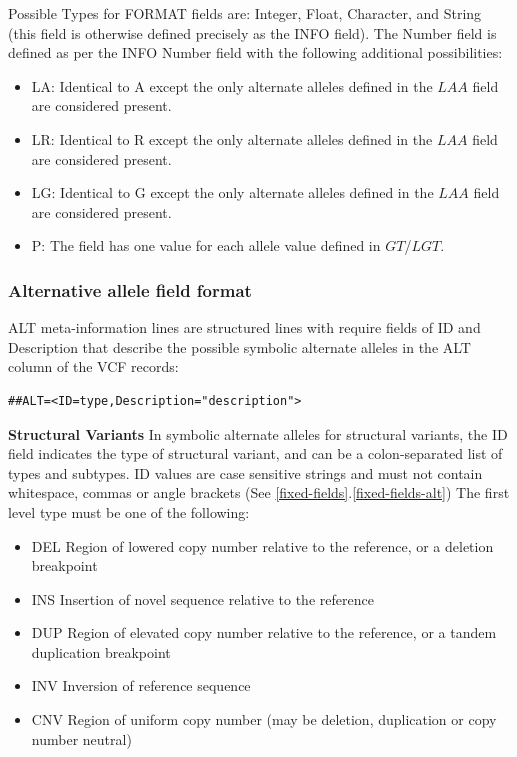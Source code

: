 \documentclass[8pt]{article}
\begin{document}
Possible Types for FORMAT fields are: Integer, Float, Character, and String (this field is otherwise defined precisely as the INFO field).
The Number field is defined as per the INFO Number field with the following additional possibilities:

\begin{itemize}
  \item LA: Identical to A except the only alternate alleles defined in the $LAA$ field are considered present.
  \item LR: Identical to R except the only alternate alleles defined in the $LAA$ field are considered present.
  \item LG: Identical to G except the only alternate alleles defined in the $LAA$ field are considered present.
  \item P: The field has one value for each allele value defined in $GT$/$LGT$.
\end{itemize}

\subsubsection{Alternative allele field format} \label{altfield}
ALT meta-information lines are structured lines with require fields of ID and Description that describe the possible symbolic alternate alleles in the ALT column of the VCF records:

\begin{verbatim}
##ALT=<ID=type,Description="description">
\end{verbatim}

\noindent \textbf{Structural Variants} \newline
In symbolic alternate alleles for structural variants, the ID field indicates the type of structural variant, and can be a colon-separated list of types and subtypes.
ID values are case sensitive strings and must not contain whitespace, commas or angle brackets (See \ref{fixed-fields}.\ref{fixed-fields-alt})
The first level type must be one of the following:
\begin{itemize}
  \item DEL Region of lowered copy number relative to the reference, or a deletion breakpoint
  \item INS Insertion of novel sequence relative to the reference
  \item DUP Region of elevated copy number relative to the reference, or a tandem duplication breakpoint
  \item INV Inversion of reference sequence
  \item CNV Region of uniform copy number (may be deletion, duplication or copy number neutral)
\end{itemize}
\end{document}
